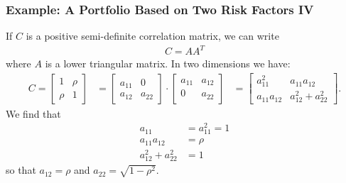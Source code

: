 \begin{frame}[fragile]
\frametitle{Example: A Portfolio Based on Two Risk Factors IV}
If $C$ is a positive semi-definite correlation matrix, we can write
		\begin{align*}
		  C = AA^T
		\end{align*} 
where $A$ is a lower triangular matrix. In two dimensions we have:
{\small \begin{align*}
  C = \left[\begin{array}{cc} 1& \rho \\
  	\rho &1 \end{array}\right] &= \left[\begin{array}{cc} a_{11}& 0 \\
  	a_{12} &a_{22} \end{array}\right] \cdot \left[\begin{array}{cc} a_{11}&
  	a_{12} \\ 0 &a_{22} \end{array}\right]
   &= \left[\begin{array}{cc} a^2_{11}&
   a_{11}a_{12} \\ a_{11}a_{12} &a^2_{12}+a^2_{22} \end{array}\right].
\end{align*}
}
We find that
\begin{align*}
  a_{11} &= a^2_{11} = 1 \\
  a_{11} a_{12} &= \rho \\
  a^2_{12}+a^2_{22} &= 1
\end{align*}
so that $a_{12}=\rho$ and $a_{22}=\sqrt{1-\rho^2}$.
\end{frame}

